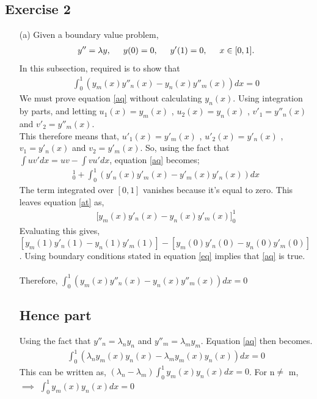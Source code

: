 \documentclass[12pt,a4paper]{article}
\begin{document}
\begin{enumerate}
\section*{Exercise 2}
\begin{enumerate}
    \item[(a)]
        Given a boundary value problem,
\begin{align}
y{''}= \lambda y,  \hspace{0.5cm} y(0) =0, \hspace{0.5cm}  y'(1) = 0, \hspace{0.5cm} x\in [0,1].
\label{eq}
\end{align}
In this subsection, required is to show that
\begin{align}
\int_{0}^{1} (y_{m}(x)y''_{n}(x)-y_{n}(x)y''_{m}(x))dx = 0
\label{aq}
\end{align}
We must prove equation \ref{aq} without calculating $y_{n}(x)$. Using integration by parts, and letting  $u_{1}(x) = y_{m}(x)$ , $u_{2}(x) = y_{n}(x)$ , $v'_{1} = y''_{n}(x)$ and $ v'_{2} = y''_{m}(x)$.\\
This therefore means that, $u'_{1}(x) = y'_{m}(x)$ , $u'_{2}(x) = y'_{n}(x)$ , $v_{1} = y'_{n}(x)$ and $ v_{2} = y'_{m}(x)$.
So, using the fact that $\int uv'dx = uv - \int vu'dx$, equation \ref{aq} becomes;
\begin{align}
[y_{m}(x)y'_{n}(x) - y_{n}(x)y'_{m}(x)]_{0}^{1} + \int_{0}^{1}(y'_n(x)y'_{m}(x) - y'_{m}(x)y'_{n}(x))dx
\label{at}
\end{align}
The term integrated over $[0,1]$ vanishes because it's equal to zero. This leaves equation \ref{at} as,
\begin{align*}
\bigg[y_{m}(x)y'_{n}(x) - y_{n}(x)y'_{m}(x)\bigg]_{0}^{1}
\end{align*}
Evaluating this gives, $[y_{m}(1)y'_{n}(1) - y_{n}(1)y'_{m}(1)] - [y_{m}(0)y'_{n}(0) - y_{n}(0)y'_{m}(0)]$. Using boundary conditions stated in equation \ref{eq} implies that \ref{aq} is true.\\\\
Therefore, $\int_{0}^{1} (y_{m}(x)y''_{n}(x)-y_{n}(x)y''_{m}(x))dx = 0$
\subsection*{Hence part}
Using the fact that $y''_{n}=\lambda _{n} y_{n}$ and $y''_{m}=\lambda _{m} y_{m}$. Equation \ref{aq} then becomes.
\begin{align*}
\int_{0}^{1} (\lambda_{n}y_{m}(x)y_{n}(x) - \lambda_{m}y_{m}(x)y_{n}(x))dx= 0
\end{align*}
This can be written as, $(\lambda_{n} - \lambda_{m})\int_{0}^{1}y_{m}(x)y_{n}(x) dx= 0 $.
For n$\ne$ m, $\implies$ $\int_{0}^{1}y_{m}(x)y_{n}(x) dx= 0 $


\end{enumerate}
\end{enumerate}
\end{document}
